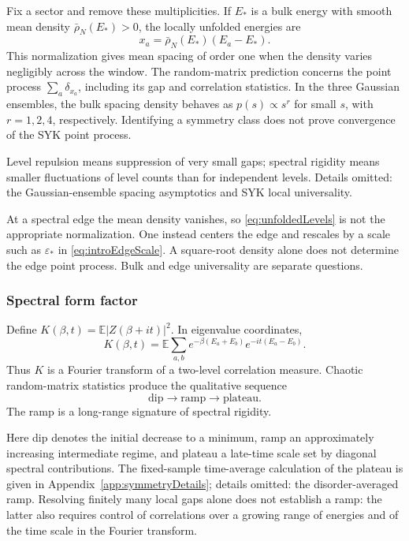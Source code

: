 \documentclass[11pt]{article}
\numberwithin{equation}{section}
\theoremstyle{exposition}
\theoremstyle{result}
\newcommand{\E}{\mathbb E}
\begin{document}
Fix a sector and remove these multiplicities. If $E_*$ is a bulk energy with smooth mean density $\bar\rho_N(E_*)>0$, the locally unfolded energies are
\begin{equation}
x_a=\bar\rho_N(E_*)(E_a-E_*).
\label{eq:unfoldedLevels}
\end{equation}
This normalization gives mean spacing of order one when the density varies negligibly across the window. The random-matrix prediction concerns the point process $\sum_a\delta_{x_a}$, including its gap and correlation statistics. In the three Gaussian ensembles, the bulk spacing density behaves as $p(s)\propto s^r$ for small $s$, with $r=1,2,4$, respectively. Identifying a symmetry class does not prove convergence of the SYK point process.

Level repulsion means suppression of very small gaps; spectral rigidity means smaller fluctuations of level counts than for independent levels. Details omitted: the Gaussian-ensemble spacing asymptotics and SYK local universality.

At a spectral edge the mean density vanishes, so \eqref{eq:unfoldedLevels} is not the appropriate normalization. One instead centers the edge and rescales by a scale such as $\varepsilon_*$ in \eqref{eq:introEdgeScale}. A square-root density alone does not determine the edge point process. Bulk and edge universality are separate questions.

\subsubsection{Spectral form factor}

Define $K(\beta,t)=\E\left|Z(\beta+it)\right|^2$. In eigenvalue coordinates,
\begin{equation*}
K(\beta,t)=
\E\sum_{a,b}
 e^{-\beta(E_a+E_b)}e^{-it(E_a-E_b)}.
\end{equation*}
Thus $K$ is a Fourier transform of a two-level correlation measure. Chaotic random-matrix statistics produce the qualitative sequence
\begin{equation*}
\text{dip}\longrightarrow\text{ramp}\longrightarrow\text{plateau}.
\end{equation*}
The ramp is a long-range signature of spectral rigidity.

Here dip denotes the initial decrease to a minimum, ramp an approximately increasing intermediate regime, and plateau a late-time scale set by diagonal spectral contributions. The fixed-sample time-average calculation of the plateau is given in Appendix~\ref{app:symmetryDetails}; details omitted: the disorder-averaged ramp. Resolving finitely many local gaps alone does not establish a ramp: the latter also requires control of correlations over a growing range of energies and of the time scale in the Fourier transform.
\end{document}
